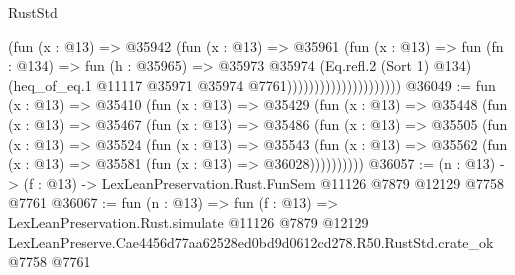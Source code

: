 \begin{lexlean}{RustStd}
\begin{coremodule}
                                      (fun (x : @13) =>
                                      @35942
                                        (fun (x : @13) =>
                                        @35961
                                          (fun (x : @13) =>
                                          fun (fn : @134) =>
                                          fun (h : @35965) =>
                                          @35973
                                            @35974
                                            (Eq.refl.{2} (Sort 1) @134)
                                            (heq_of_eq.{1}
                                              @11117
                                              @35971
                                              @35974
                                              @7761)))))))))))))))))))))
@36049 := fun (x : @13) =>
  @35410
    (fun (x : @13) =>
    @35429
      (fun (x : @13) =>
      @35448
        (fun (x : @13) =>
        @35467
          (fun (x : @13) =>
          @35486
            (fun (x : @13) =>
            @35505
              (fun (x : @13) =>
              @35524
                (fun (x : @13) =>
                @35543
                  (fun (x : @13) =>
                  @35562 (fun (x : @13) => @35581 (fun (x : @13) => @36028))))))))))
@36057 := (n : @13) -> (f : @13) -> LexLeanPreservation.Rust.FunSem @11126 @7879 @12129 @7758 @7761
@36067 := fun (n : @13) =>
  fun (f : @13) =>
  LexLeanPreservation.Rust.simulate
    @11126
    @7879
    @12129
    LexLeanPreserve.Cae4456d77aa62528ed0bd9d0612cd278.R50.RustStd.crate_ok
    @7758
    @7761
\end{coremodule}
\end{lexlean}
